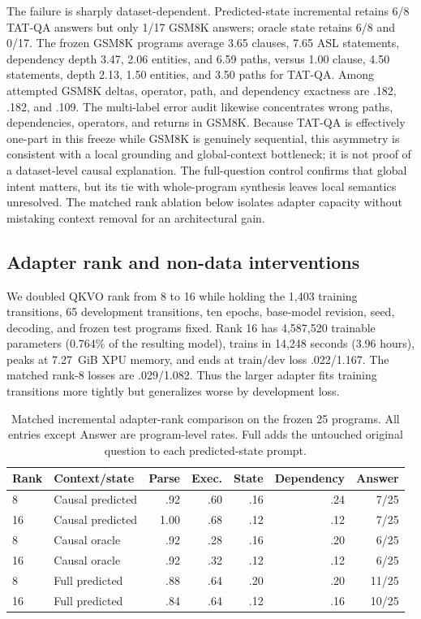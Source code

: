 \documentclass[11pt]{article}
\begin{document}
The failure is sharply dataset-dependent. Predicted-state incremental retains
6/8 TAT-QA answers but only 1/17 GSM8K answers; oracle state retains 6/8 and 0/17.
The frozen GSM8K programs average 3.65 clauses, 7.65 ASL statements, dependency
depth 3.47, 2.06 entities, and 6.59 paths, versus 1.00 clause, 4.50 statements,
depth 2.13, 1.50 entities, and 3.50 paths for TAT-QA. Among attempted GSM8K deltas,
operator, path, and dependency exactness are .182, .182, and .109. The multi-label
error audit likewise concentrates wrong paths, dependencies, operators, and
returns in GSM8K. Because TAT-QA is effectively one-part in this freeze while
GSM8K is genuinely sequential, this asymmetry is consistent with a local
grounding and global-context bottleneck; it is not proof of a dataset-level
causal explanation. The full-question control confirms that global intent matters,
but its tie with whole-program synthesis leaves local semantics unresolved.
The matched rank ablation below isolates adapter capacity without mistaking
context removal for an architectural gain.

\subsection{Adapter rank and non-data interventions}

We doubled QKVO rank from 8 to 16 while holding the 1,403 training transitions,
65 development transitions, ten epochs, base-model revision, seed, decoding,
and frozen test programs fixed. Rank 16 has 4,587,520 trainable parameters
(0.764\% of the resulting model), trains in 14,248 seconds (3.96 hours), peaks
at 7.27~GiB XPU memory, and ends at train/dev loss .022/1.167. The matched
rank-8 losses are .029/1.082. Thus the larger adapter fits training transitions
more tightly but generalizes worse by development loss.

\begin{table}[t]
\centering\small
\caption{Matched incremental adapter-rank comparison on the frozen 25 programs.
All entries except Answer are program-level rates. Full adds the untouched
original question to each predicted-state prompt.}
\label{tab:asl-rank-capacity}
\begin{tabular}{llrrrrr}
\toprule
Rank & Context/state & Parse & Exec. & State & Dependency & Answer\\
\midrule
8  & Causal predicted & .92 & .60 & .16 & .24 & 7/25\\
16 & Causal predicted & 1.00 & .68 & .12 & .12 & 7/25\\
8  & Causal oracle    & .92 & .28 & .16 & .20 & 6/25\\
16 & Causal oracle    & .92 & .32 & .12 & .12 & 6/25\\
8  & Full predicted   & .88 & .64 & .20 & .20 & 11/25\\
16 & Full predicted   & .84 & .64 & .12 & .16 & 10/25\\
\bottomrule
\end{tabular}
\end{table}
\end{document}
